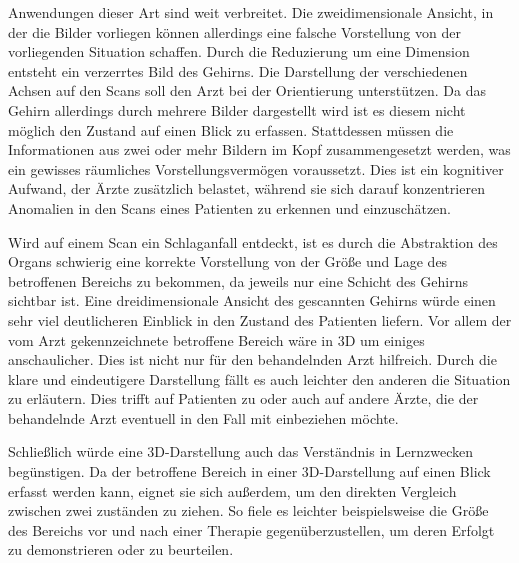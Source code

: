 Anwendungen dieser Art sind weit verbreitet. Die zweidimensionale Ansicht, in der die Bilder vorliegen können allerdings eine falsche Vorstellung von der vorliegenden Situation schaffen. 
Durch die Reduzierung um eine Dimension entsteht ein verzerrtes Bild des Gehirns. Die Darstellung der verschiedenen Achsen auf den Scans soll den Arzt bei der Orientierung unterstützen. Da das Gehirn allerdings durch mehrere Bilder dargestellt wird ist es diesem nicht möglich den Zustand auf einen Blick zu erfassen. Stattdessen müssen die Informationen aus zwei oder mehr Bildern im Kopf zusammengesetzt werden, was ein gewisses räumliches Vorstellungsvermögen voraussetzt. Dies ist ein kognitiver Aufwand, der Ärzte zusätzlich belastet, während sie sich darauf konzentrieren Anomalien in den Scans eines Patienten zu erkennen und einzuschätzen. 

Wird auf einem Scan ein Schlaganfall entdeckt, ist es durch die Abstraktion des Organs schwierig eine korrekte Vorstellung von der Größe und Lage des betroffenen Bereichs zu bekommen, da jeweils nur eine Schicht des Gehirns sichtbar ist. 
Eine dreidimensionale Ansicht des gescannten Gehirns würde einen sehr viel deutlicheren Einblick in den Zustand des Patienten liefern. Vor allem der vom Arzt gekennzeichnete betroffene Bereich wäre in 3D um einiges anschaulicher. Dies ist nicht nur für den behandelnden Arzt hilfreich. Durch die klare und eindeutigere Darstellung fällt es auch leichter den anderen die Situation zu erläutern. Dies trifft auf Patienten zu oder auch auf andere Ärzte, die der behandelnde Arzt eventuell in den Fall mit einbeziehen möchte.

Schließlich würde eine 3D-Darstellung auch das Verständnis in Lernzwecken begünstigen.
Da der betroffene Bereich in einer 3D-Darstellung auf einen Blick erfasst werden kann, eignet sie sich außerdem, um den direkten Vergleich zwischen zwei zuständen zu ziehen. So fiele es leichter beispielsweise die Größe des Bereichs vor und nach einer Therapie gegenüberzustellen, um deren Erfolgt zu demonstrieren oder zu beurteilen.

